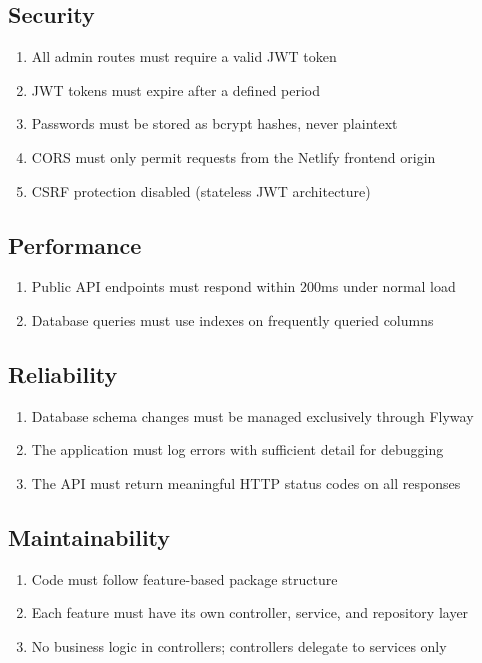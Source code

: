 \documentclass[11pt,a4paper]{article}
\begin{document}
	\subsection{Security}
	\begin{enumerate}[label=\textbf{NFR-\arabic*:}, leftmargin=2cm, itemsep=0.2em]
		\item All admin routes must require a valid JWT token
		\item JWT tokens must expire after a defined period
		\item Passwords must be stored as bcrypt hashes, never plaintext
		\item CORS must only permit requests from the Netlify frontend origin
		\item CSRF protection disabled (stateless JWT architecture)
	\end{enumerate}
	
	\subsection{Performance}
	\begin{enumerate}[label=\textbf{NFR-\arabic*:}, leftmargin=2cm, itemsep=0.2em, resume]
		\item Public API endpoints must respond within 200ms under normal load
		\item Database queries must use indexes on frequently queried columns
	\end{enumerate}
	
	\subsection{Reliability}
	\begin{enumerate}[label=\textbf{NFR-\arabic*:}, leftmargin=2cm, itemsep=0.2em, resume]
		\item Database schema changes must be managed exclusively through Flyway
		\item The application must log errors with sufficient detail for debugging
		\item The API must return meaningful HTTP status codes on all responses
	\end{enumerate}
	
	\subsection{Maintainability}
	\begin{enumerate}[label=\textbf{NFR-\arabic*:}, leftmargin=2cm, itemsep=0.2em, resume]
		\item Code must follow feature-based package structure
		\item Each feature must have its own controller, service, and repository layer
		\item No business logic in controllers; controllers delegate to services only
	\end{enumerate}
	
\end{document}
